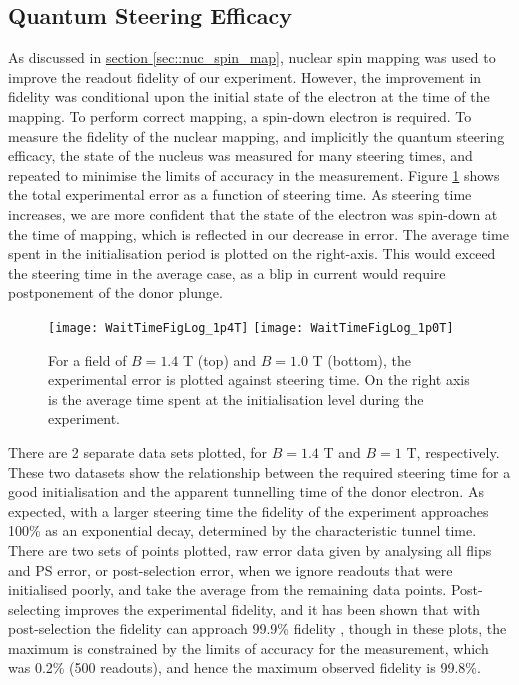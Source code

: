 \label{sec::results}
\subsection{Quantum Steering Efficacy}

	As discussed in \hyperref[sec::nuc_spin_map]{section \ref{sec::nuc_spin_map}}, nuclear spin mapping was used to improve the readout fidelity of our experiment. However, the improvement in fidelity was conditional upon the initial state of the electron at the time of the mapping. To perform correct mapping, a spin-down electron is required. To measure the fidelity of the nuclear mapping, and implicitly the quantum steering efficacy, the state of the nucleus was measured for many steering times, and repeated to minimise the limits of accuracy in the measurement. Figure \ref{fig::wait_time} shows the total experimental error as a function of steering time. As steering time increases, we are more confident that the state of the electron was spin-down at the time of mapping, which is reflected in our decrease in error. The average time spent in the initialisation period is plotted on the right-axis. This would exceed the steering time in the average case, as a blip in current would require postponement of the donor plunge.
	
	\begin{figure}[htbp!]
		\centering
		\texttt{[image: WaitTimeFigLog\_1p4T]}
		\texttt{[image: WaitTimeFigLog\_1p0T]}
		\caption{For a field of $B = 1.4$ T (top) and $B = 1.0$ T (bottom), the experimental error is plotted against steering time. On  the right axis is the average time spent at the initialisation level during the experiment.}
		\label{fig::wait_time}
	\end{figure}
	
	There are 2 separate data sets plotted, for $B = 1.4$ T and $B = 1$ T, respectively. These two datasets show the relationship between the required steering time for a good initialisation and the apparent tunnelling time of the donor electron. As expected, with a larger steering time the fidelity of the experiment approaches 100\% as an exponential decay, determined by the characteristic tunnel time. There are two sets of points plotted, raw error data given by analysing all flips and PS error, or post-selection error, when we ignore readouts that were initialised poorly, and take the average from the remaining data points. Post-selecting improves the experimental fidelity, and it has been shown that with post-selection the fidelity can approach 99.9\% fidelity , though in these plots, the maximum is constrained by the limits of accuracy for the measurement, which was 0.2\% (500 readouts), and hence the maximum observed fidelity is 99.8\%. 
	

